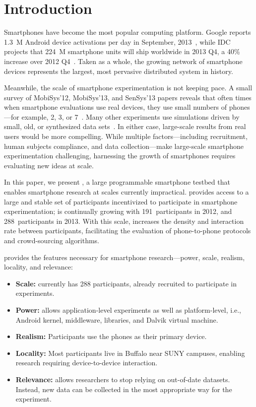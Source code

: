 \section{Introduction}
\label{sec-introduction}

Smartphones have become the most popular computing platform. Google reports
1.3~M Android device activations per day in September,
2013~\cite{google-Sep2012-activations}, while IDC projects that 224~M smartphone
units will ship worldwide in 2013 Q4, a 40\% increase over 2012
Q4~\cite{idc-smartphone-growth}. Taken as a whole, the growing network of
smartphone devices represents the largest, most pervasive distributed system in
history.

Meanwhile, the scale of smartphone experimentation is not keeping pace. A small
survey of MobiSys'12, MobiSys'13, and SenSys'13 papers reveals that often times
when smartphone evaluations use real devices, they use small numbers of
phones---for example, 2, 3, or 7~\cite{nowar-mobisys12, wang:mobisys:2013,
hao:sensys:2013}. Many other experiments use simulations driven by small, old,
or synthesized data sets~\cite{falcon-mobisys12, ace-mobisys12,
humanmobility-mobisys12}. In either case, large-scale results from real users
would be more compelling. While multiple factors---including recruitment, human
subjects compliance, and data collection---make large-scale smartphone
experimentation challenging, harnessing the growth of smartphones requires
evaluating new ideas at scale.

In this paper, we present \PhoneLab{}, a large programmable smartphone testbed
that enables smartphone research at scales currently impractical. \PhoneLab{}
provides access to a large and stable set of participants incentivized to
participate in smartphone experimentation; \PhoneLab{} is continually growing
with 191~participants in 2012, and 288~participants in 2013. With this scale,
\PhoneLab{} increases the density and interaction rate between participants,
facilitating the evaluation of phone-to-phone protocols and crowd-sourcing
algorithms.

\PhoneLab{} provides the features necessary for smartphone research---power,
scale, realism, locality, and relevance:

\begin{itemize}
\item {\bf Scale:} \PhoneLab{} currently has 288 participants, already recruited
to participate in experiments.
\item {\bf Power:} \PhoneLab{} allows application-level experiments as well
as platform-level, i.e., Android kernel, middleware, libraries, and Dalvik
virtual machine.
\item {\bf Realism:} Participants use the phones as their primary device.
\item {\bf Locality:} Most participants live in Buffalo near SUNY campuses,
enabling research requiring device-to-device interaction.
\item {\bf Relevance:} \PhoneLab{} allows researchers to stop relying on
out-of-date datasets. Instead, new data can be collected in the most
appropriate way for the experiment.
\vspace{0.05in}
\end{itemize}

